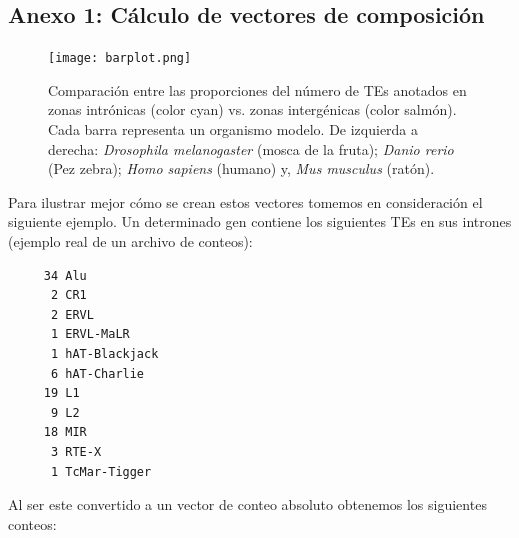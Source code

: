 \documentclass[12pt]{article}
\begin{document}
\subsection{Anexo 1: Cálculo de vectores de composición}

\begin{figure}[ht!]
    \centering
    \small
    \texttt{[image: barplot.png]}
    \caption{Comparación entre las proporciones del número de TEs anotados en zonas intrónicas (color cyan) vs. zonas intergénicas (color salmón). Cada barra representa un organismo modelo. De izquierda a derecha: \emph{Drosophila melanogaster} (mosca de la fruta); \emph{Danio rerio} (Pez zebra); \emph{Homo sapiens} (humano) y, \emph{Mus musculus} (ratón).}
    \label{fig:distribucion}
\end{figure}

Para ilustrar mejor cómo se crean estos vectores tomemos en consideración el siguiente ejemplo.
Un determinado gen contiene los siguientes TEs en sus intrones (ejemplo real de un archivo de conteos):
\begin{verbatim}
     34 Alu
      2 CR1
      2 ERVL
      1 ERVL-MaLR
      1 hAT-Blackjack
      6 hAT-Charlie
     19 L1
      9 L2
     18 MIR
      3 RTE-X
      1 TcMar-Tigger
\end{verbatim}
Al ser este convertido a un vector de conteo absoluto obtenemos los siguientes conteos: 
\end{document}
